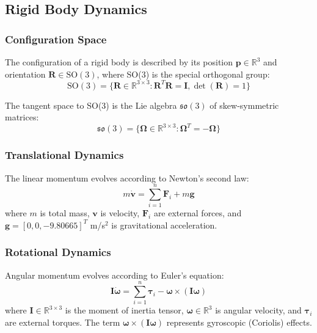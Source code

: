 \documentclass[12pt,a4paper]{article}
\begin{document}
\subsection{Rigid Body Dynamics}

\subsubsection{Configuration Space}
The configuration of a rigid body is described by its position $\mathbf{p} \in \mathbb{R}^3$ and orientation $\mathbf{R} \in \text{SO}(3)$, where SO(3) is the special orthogonal group:
\begin{equation}
    \text{SO}(3) = \{\mathbf{R} \in \mathbb{R}^{3 \times 3} : \mathbf{R}^T\mathbf{R} = \mathbf{I}, \det(\mathbf{R}) = 1\}
\end{equation}

The tangent space to SO(3) is the Lie algebra $\mathfrak{so}(3)$ of skew-symmetric matrices:
\begin{equation}
    \mathfrak{so}(3) = \{\boldsymbol{\Omega} \in \mathbb{R}^{3 \times 3} : \boldsymbol{\Omega}^T = -\boldsymbol{\Omega}\}
\end{equation}

\subsubsection{Translational Dynamics}
The linear momentum evolves according to Newton's second law:
\begin{equation}
    m\dot{\mathbf{v}} = \sum_{i=1}^{n} \mathbf{F}_i + m\mathbf{g}
    \label{eq:newton}
\end{equation}
where $m$ is total mass, $\mathbf{v}$ is velocity, $\mathbf{F}_i$ are external forces, and $\mathbf{g} = [0, 0, -9.80665]^T$ m/s$^2$ is gravitational acceleration.

\subsubsection{Rotational Dynamics}
Angular momentum evolves according to Euler's equation:
\begin{equation}
    \mathbf{I}\dot{\boldsymbol{\omega}} = \sum_{i=1}^{n} \boldsymbol{\tau}_i - \boldsymbol{\omega} \times (\mathbf{I}\boldsymbol{\omega})
    \label{eq:euler}
\end{equation}
where $\mathbf{I} \in \mathbb{R}^{3 \times 3}$ is the moment of inertia tensor, $\boldsymbol{\omega} \in \mathbb{R}^3$ is angular velocity, and $\boldsymbol{\tau}_i$ are external torques. The term $\boldsymbol{\omega} \times (\mathbf{I}\boldsymbol{\omega})$ represents gyroscopic (Coriolis) effects.
\end{document}
